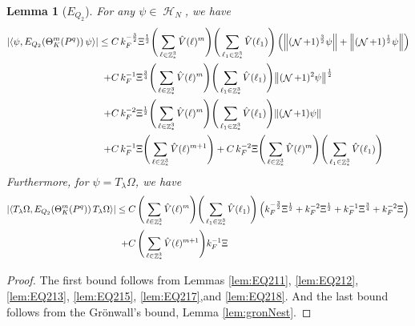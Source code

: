 \documentclass[sn-mathphys, Numbered ,a4paper]{sn-jnl}%
\DeclareMathOperator{\Z}{\mathbb{Z}}
\DeclareMathOperator{\HH}{\mathcal{H}}
\DeclareMathOperator{\NN}{\mathcal{N}}
\newcommand{\half}{\frac{1}{2}}
\newcommand{\eva}[1]{\left\langle #1 \right\rangle}
\theoremstyle{plain}
\newtheorem{lemma}[theorem]{Lemma}
\theoremstyle{definition}
\theoremstyle{remark}
\theoremstyle{plain}
\theoremstyle{definition}
\theoremstyle{remark}
\begin{document}
\begin{lemma}[$E_{Q_2}$]
    For any $\psi \in \HH_N$, we have
    \begin{align}
    	\abs{\eva{\psi, E_{Q_2}\!\left(\Theta^m_K(P^q)\right)  \psi}} \leq \; &C\,  k_{F}^{-\frac{3}{2}} \Xi^\half \Bigg(\sum\limits_{\ell \in \Z^3_*} \hat{V}(\ell)^m\Bigg)\Bigg( \sum\limits_{\ell_1 \in \Z^3_*} \hat{V}(\ell_1) \Bigg) \left(\norm { (\NN+1)^{\frac{3}{2}} \psi } + \norm { (\NN+1)^{\frac{1}{2}} \psi } \right)\nonumber\\
    	\quad+ &C\, k_{F}^{-1}\Xi^{\frac{3}{4}} \Bigg(\sum\limits_{\ell \in \Z^3_*} \hat{V}(\ell)^m\Bigg) \Bigg(\sum\limits_{\ell_1 \in \Z^3_*} \hat{V}(\ell_1) \Bigg)  \norm{ (\NN+1)^2\psi}^\half \nonumber\\ 
    	\quad+ &C\, k_{F}^{-2}\Xi^{\frac{1}{2}} \Bigg(\sum\limits_{\ell \in \Z^3_*} \hat{V}(\ell)^m\Bigg) \Bigg(\sum\limits_{\ell_1 \in \Z^3_*} \hat{V}(\ell_1) \Bigg)  \norm{ (\NN+1)\psi} \nonumber\\
    	\quad+ &C\, k_{F}^{-1}\Xi \Bigg(\sum\limits_{\ell \in \Z^3_*} \hat{V}(\ell)^{m+1}\Bigg) + C\, k_{F}^{-2}\Xi \Bigg(\sum\limits_{\ell \in \Z^3_*} \hat{V}(\ell)^m\Bigg) \Bigg(\sum\limits_{\ell_1 \in \Z^3_*} \hat{V}(\ell_1) \Bigg) \label{eq:genEQ2est}
    \end{align}
    Furthermore, for $\psi = T_{\lambda}\Omega$, we have 
    \begin{align}
    	\abs{\eva{ T_{\lambda}\Omega, E_{Q_2}\!\left(\Theta^m_K(P^q) \right)  T_{\lambda}\Omega}} \leq \; &C\,  \Bigg(\sum\limits_{\ell \in \Z^3_*} \hat{V}(\ell)^m\Bigg)\Bigg( \sum\limits_{\ell_1 \in \Z^3_*} \hat{V}(\ell_1) \Bigg)\left( k_{F}^{-\frac{3}{2}} \Xi^\half 
    	+k_{F}^{-2} \Xi^\half 
    	+ k_{F}^{-1}\Xi^{\frac{3}{4}} + k_{F}^{-2}\Xi \right)\nonumber\\
    	\quad + &C\, \Bigg(\sum\limits_{\ell \in \Z^3_*} \hat{V}(\ell)^{m+1}\Bigg)  k_{F}^{-1}\Xi \label{eq:finalEQ2est}
    \end{align}
\end{lemma}
\begin{proof}
    	The first bound follows from Lemmas \ref{lem:EQ211}, \ref{lem:EQ212}, \ref{lem:EQ213}, \ref{lem:EQ215}, \ref{lem:EQ217},and \ref{lem:EQ218}. And the last bound follows from the Gr\"onwall's bound, Lemma \ref{lem:gronNest}. 
\end{proof}
\end{document}
